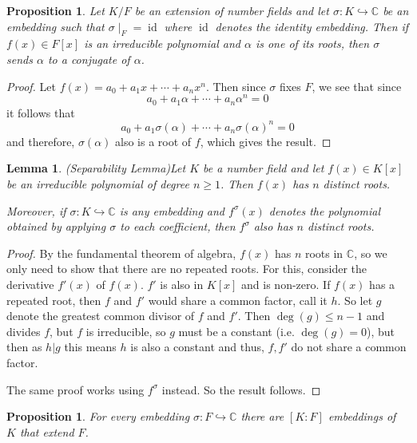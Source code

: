 \documentclass[11pt,a4paper]{report}
\theoremstyle{plain}
\newtheorem{lemma}[subsection]{Lemma}
\newtheorem{prop}[subsection]{Proposition}
\theoremstyle{definition}
\theoremstyle{definition}
\def\CC{\mathbb{C}}
\def \a{\alpha}
\def \s {\sigma}
\def \s {\sigma}
\newcommand{\id}{\operatorname{id}}
\begin{document}
	
	\begin{prop}\label{prop: conj roots emb}
		Let $K/F$ be an extension of number fields and let $\sigma: K \hookrightarrow \CC$ be an embedding such that $\sigma\mid_F=\id$ where $\id$ denotes the identity embedding. Then if $f(x) \in F[x]$ is an irreducible polynomial and $\a$ is one of its roots, then $\sigma$ sends $\a$ to a conjugate of $\a$.
	\end{prop}
	
	\begin{proof}
		Let $f(x)= a_0+a_1x+\cdots+a_nx^n$. Then since $\sigma$ fixes $F$, we see that since \[a_0+a_1\a+\cdots+a_n\a^n=0\] it follows that  \[a_0+a_1\sigma(\a)+\cdots+a_n\sigma(\a)^n=0\] and therefore, $\sigma(\a)$ also is a root of $f$, which gives the result.
	\end{proof}
	
	\begin{lemma}(Separability Lemma)\label{lem: sep lemma} Let $K$ be a number field and let $f(x) \in K[x]$ be an irreducible polynomial of degree $n \geq 1$. Then $f(x)$ has $n$ distinct roots.
		
		Moreover, if $\s:K \hookrightarrow \CC$ is any embedding and $f^\s(x)$ denotes the polynomial obtained by applying $\s$ to each coefficient, then $f^\s$ also has $n$ distinct roots.
		
		
		
	\end{lemma}
	\begin{proof}
		By the fundamental theorem of algebra, $f(x)$ has $n$ roots in $\CC$, so we only need to show that there are no repeated roots. For this, consider the derivative $f'(x)$ of $f(x)$. $f'$ is also in $K[x]$ and is non-zero. If $f(x)$ has a repeated root, then $f$ and $f'$ would share a common factor, call it $h$. So let $g$ denote the greatest common divisor of $f$ and $f'$. Then $\deg(g) \leq n-1$ and divides $f$, but $f$ is irreducible, so $g$ must be a constant (i.e. $\deg(g)=0$), but then as $h|g$ this means $h$ is also a constant and thus, $f,f'$ do not share a common factor.
		
		The same proof works using $f^\s$ instead. So the result follows.
	\end{proof}
	
	\begin{prop}\label{prop: emb extns}
		For every embedding $\s: F \hookrightarrow \CC$ there are $[K:F]$ embeddings of $K$ that extend $F$.
	\end{prop}
	
\end{document}
